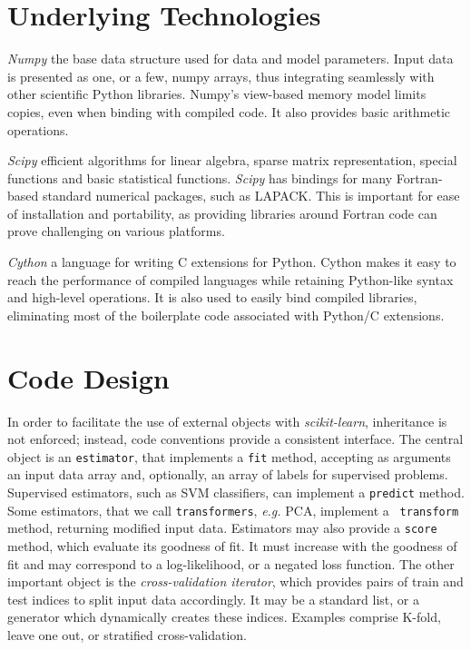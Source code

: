 \documentclass[twoside,11pt]{article}
\begin{document}
\section{Underlying Technologies}

\emph{Numpy}
%
the base data structure used for data and model parameters.
Input data is
presented as one, or a few, numpy arrays, thus integrating seamlessly
with other scientific Python libraries. Numpy's view-based memory
model limits copies, even when binding with compiled code. It also
provides basic arithmetic operations.

\emph{Scipy}
%
efficient algorithms for linear algebra, sparse matrix representation,
special functions and basic statistical functions. {\sl Scipy} has
bindings for many Fortran-based standard numerical packages, such as
LAPACK. This is important for ease of installation and portability, as
providing libraries around Fortran code can prove challenging on
various platforms.

\emph{Cython}
%
a language for writing C extensions for Python. Cython makes it easy to
reach the performance of compiled languages while retaining
Python-like syntax and high-level operations. It is also used to
easily bind compiled libraries, eliminating most of the boilerplate code
associated with Python/C extensions.

\section{Code Design}

%
In order to facilitate the use of external objects with \emph{scikit-learn},
inheritance is not enforced; instead, code
conventions provide a consistent interface.
The central object is an {\tt estimator}, that implements a
{\tt fit} method, accepting as arguments an input data array and,
optionally, an array of labels for supervised problems. Supervised estimators,
such as SVM classifiers, can implement a {\tt predict} method. Some estimators,
that we call {\tt transformers}, \emph{e.g.} PCA, implement a {\tt
transform} method, returning modified input data.
%
Estimators may also provide a {\tt score} method, which evaluate its
goodness of fit. It must increase with the goodness of fit and
may correspond to a log-likelihood, or a negated loss function.
%
The other important object is the \emph{cross-validation iterator},
which provides pairs of train and test indices to split input
data accordingly. It may be a standard list, or a generator
which dynamically
creates these indices.
Examples comprise K-fold,
leave one out, or
stratified cross-validation.
\end{document}
